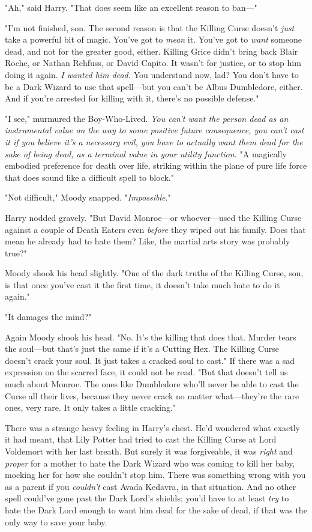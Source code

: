 "Ah," said Harry. "That does seem like an excellent reason to ban—"

"I'm not finished, son. The second reason is that the Killing Curse doesn't
\emph{just} take a powerful bit of magic. You've got to \emph{mean} it. You've
got to \emph{want} someone dead, and not for the greater good, either. Killing
Grice didn't bring back Blair Roche, or Nathan Rehfuss, or David Capito. It
wasn't for justice, or to stop him doing it again. \emph{I wanted him dead.}
You understand now, lad? You don't have to be a Dark Wizard to use that
spell—but you can't be Albus Dumbledore, either. And if you're arrested for
killing with it, there's no possible defense."

"I{\el} see," murmured the Boy-Who-Lived. \emph{You can't want the person
dead as an instrumental value on the way to some positive future consequence,
you can't cast it if you believe it's a necessary evil, you have to actually
want them dead for the sake of being dead, as a terminal value in your utility
function.} "A magically embodied preference for death over life, striking
within the plane of pure life force{\el} that does sound like a difficult
spell to block."

"Not difficult," Moody snapped. "\emph{Impossible}."

Harry nodded gravely. "But David Monroe—or whoever—used the Killing Curse
against a couple of Death Eaters even \emph{before} they wiped out his family.
Does that mean he already had to hate them? Like, the martial arts story was
probably true?"

Moody shook his head slightly. "One of the dark truths of the Killing Curse,
son, is that once you've cast it the first time, it doesn't take much hate to
do it again."

"It damages the mind?"

Again Moody shook his head. "No. It's the killing that does that. Murder tears
the soul—but that's just the same if it's a Cutting Hex. The Killing Curse
doesn't crack your soul. It just takes a cracked soul to cast." If there was a
sad expression on the scarred face, it could not be read. "But that doesn't
tell us much about Monroe. The ones like Dumbledore who'll never be able to
cast the Curse all their lives, because they never crack no matter
what—they're the rare ones, very rare. It only takes a little cracking."

There was a strange heavy feeling in Harry's chest. He'd wondered what exactly
it had meant, that Lily Potter had tried to cast the Killing Curse at Lord
Voldemort with her last breath. But surely it was forgiveable, it was
\emph{right} and \emph{proper} for a mother to hate the Dark Wizard who was
coming to kill her baby, mocking her for how she couldn't stop him. There was
something wrong with you as a parent if you \emph{couldn't} cast Avada Kedavra,
in that situation. And no other spell could've gone past the Dark Lord's
shields; you'd have to at least \emph{try} to hate the Dark Lord enough to want
him dead for the sake of dead, if that was the only way to save your baby.

